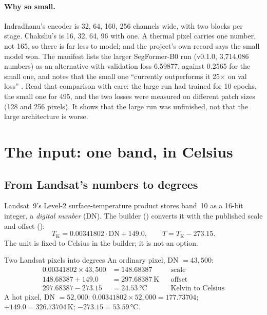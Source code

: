 \paragraph{Why so small.} Indradhanu's encoder is 32, 64, 160, 256 channels wide, with two blocks per stage.
Chakshu's is 16, 32, 64, 96 with one. A thermal pixel carries one number, not 165, so there is far less to model;
and the project's own record says the small model won. The manifest lists the larger SegFormer-B0 run (v0.1.0,
3,714,086 numbers) as an alternative with validation loss 6.59877, against 0.2565 for the small one, and notes that
the small one ``currently outperforms it 25$\times$ on val loss'' . Read that comparison with care: the large run had trained for 10 epochs, the small one for 495, and the
two losses were measured on different patch sizes (128 and 256 pixels). It shows that the large run was unfinished,
not that the large architecture is worse.

\section{The input: one band, in Celsius}\label{sec:chakshu:input}

\subsection{From Landsat's numbers to degrees}

Landsat~9's Level-2 surface-temperature product stores band~10 as a 16-bit integer, a \emph{digital
number} (DN). The builder () converts
it with the published scale and offset ():
\begin{equation}\label{eq:chakshu:dn}
T_{\mathrm{K}} = 0.00341802\cdot\mathrm{DN} + 149.0, \qquad T = T_{\mathrm{K}} - 273.15 .
\end{equation}
The unit is fixed to Celsius in the builder; it is not an option.

\begin{worked}[label={we:chakshu:dn}]{Two Landsat pixels into degrees}
An ordinary pixel, DN $=43{,}500$:
\begin{align*}
0.00341802\times43{,}500 &= 148.68387 && \text{scale}\\
148.68387+149.0 &= 297.68387\ \text{K} && \text{offset}\\
297.68387-273.15 &= 24.53\ \text{°C} && \text{Kelvin to Celsius}
\end{align*}
A hot pixel, DN $=52{,}000$: $0.00341802\times52{,}000=177.73704$; $+149.0=326.73704$\,K; $-273.15=53.59$\,°C.
\end{worked}


